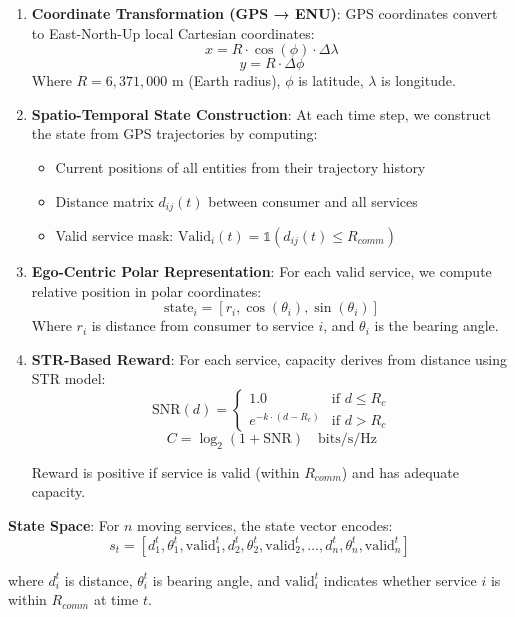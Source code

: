 \documentclass[
  10pt,
  twocolumn,
]{article}
\providecommand{\tightlist}{%
  \setlength{\itemsep}{0pt}\setlength{\parskip}{0pt}}
\begin{document}
\begin{enumerate}
	\def\labelenumi{\arabic{enumi}.}
	\item
	      \textbf{Coordinate Transformation (GPS → ENU)}: GPS coordinates
	      convert to East-North-Up local Cartesian coordinates:
	      \[x = R \cdot \cos(\phi) \cdot \Delta\lambda\]
	      \[y = R \cdot \Delta\phi\] Where \(R = 6,371,000\) m (Earth radius),
	      \(\phi\) is latitude, \(\lambda\) is longitude.
	\item
	      \textbf{Spatio-Temporal State Construction}: At each time step, we
	      construct the state from GPS trajectories by computing:

	      \begin{itemize}
		      \tightlist
		      \item
		            Current positions of all entities from their trajectory history
		      \item
		            Distance matrix \(d_{ij}(t)\) between consumer and all services
		      \item
		            Valid service mask:
		            \(\text{Valid}_i(t) = \mathbb{1}(d_{ij}(t) \leq R_{comm})\)
	      \end{itemize}
	\item
	      \textbf{Ego-Centric Polar Representation}: For each valid service, we
	      compute relative position in polar coordinates:
	      \[\text{state}_i = [r_i, \cos(\theta_i), \sin(\theta_i)]\] Where
	      \(r_i\) is distance from consumer to service \(i\), and \(\theta_i\)
	      is the bearing angle.
	\item
	      \textbf{STR-Based Reward}: For each service, capacity derives from
	      distance using STR model:
	      \[\text{SNR}(d) = \begin{cases} 1.0 & \text{if } d \leq R_c \\ e^{-k \cdot (d-R_c)} & \text{if } d > R_c \end{cases}\]
	      \[C = \log_2(1 + \text{SNR}) \quad \text{bits/s/Hz}\]

	      Reward is positive if service is valid (within \(R_{comm}\)) and has
	      adequate capacity.
\end{enumerate}

\textbf{State Space}: For \(n\) moving services, the state vector
encodes:
\[s_t = [d_1^t, \theta_1^t, \text{valid}_1^t, d_2^t, \theta_2^t, \text{valid}_2^t, ..., d_n^t, \theta_n^t, \text{valid}_n^t]\]

where \(d_i^t\) is distance, \(\theta_i^t\) is bearing angle, and
\(\text{valid}_i^t\) indicates whether service \(i\) is within
\(R_{comm}\) at time \(t\).
\end{document}
